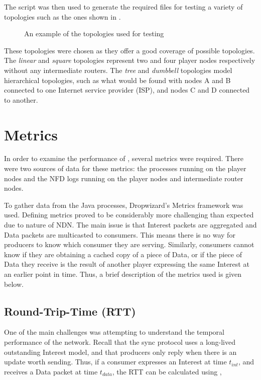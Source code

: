 The script was then used to generate the required files for testing a variety of topologies such as the ones shown in .


\begin{figure}
    \centering
    \caption{An example of the topologies used for testing \game{}}
    \label{fig:impl:topologies}
\end{figure}

These topologies were chosen as they offer a good coverage of possible topologies. The \textit{linear} and \textit{square} topologies represent two and four player nodes respectively without any intermediate routers. The \textit{tree} and \textit{dumbbell} topologies model hierarchical topologies, such as what would be found with nodes A and B connected to one Internet service provider (ISP), and nodes C and D connected to another.  


\section{Metrics}\label{sec:impl:metrics}
In order to examine the performance of \game{}, several metrics were required. There were two sources of data for these metrics: the \game{} processes running on the player nodes and the NFD logs running on the player nodes and intermediate router nodes. 

To gather data from the \game{} Java processes, Dropwizard's Metrics framework \cite{dropwizard-metrics} was used. Defining metrics proved to be considerably more challenging than expected due to nature of NDN. The main issue is that Interest packets are aggregated and Data packets are multicasted to consumers. This means there is no way for producers to know which consumer they are serving. Similarly, consumers cannot know if they are obtaining a cached copy of a piece of Data, or if the piece of Data they receive is the result of another player expressing the same Interest at an earlier point in time. Thus, a brief description of the metrics used is given below.

\subsection{Round-Trip-Time (RTT)}
One of the main challenges was attempting to understand the temporal performance of the network. Recall that the sync protocol uses a long-lived outstanding Interest model, and that producers only reply when there is an update worth sending. Thus, if a consumer expresses an Interest at time $t_{int}$, and receives a Data packet at time $t_{data}$, the RTT can be calculated using ,

